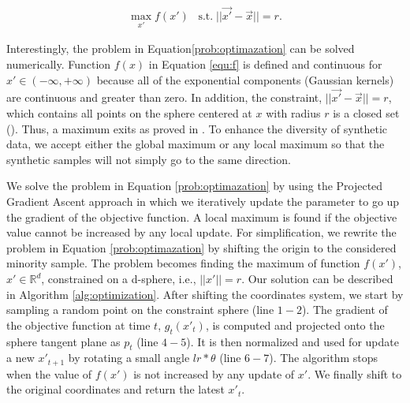 \begin{align}
	\label{prob:optimazation}
	\max_{x'} {f(x')} \;\;\; \textrm{s.t.}\; ||\vec{x'} - \vec{x}||=r.
\end{align}

Interestingly, the problem in Equation\ref{prob:optimazation} can be solved numerically. Function $f(x)$ in Equation \ref{equ:f} is defined and continuous for $x' \in (-\infty, +\infty)$ because all of the exponential components (Gaussian kernels) are continuous and greater than zero. In addition, the constraint, $||\vec{x'} - \vec{x}||=r$, which contains all points on the sphere centered at $x$ with radius $r$ is a closed set (\cite{wikipedia_2021}). Thus, a maximum exits as proved in \cite{maximum_exist}. To enhance the diversity of synthetic data, we accept either the global maximum or any local maximum so that the synthetic samples will not simply go to the same direction.  


We solve the problem in Equation \ref{prob:optimazation} by using the Projected Gradient Ascent approach in which we iteratively update the parameter to go up the gradient of the objective function. A local maximum is found if the objective value cannot be increased by any local update. For simplification, we rewrite the problem in Equation \ref{prob:optimazation} by shifting the origin to the considered minority sample. The problem becomes finding the maximum of function $f(x')$, $x' \in \mathbb{R}^d$, constrained on a d-sphere, i.e., $||x'||=r$. Our solution can be described in Algorithm \ref{alg:optimization}. After shifting the coordinates system, we start by sampling a random point on the constraint sphere (line $1-2$). The gradient of the objective function at time $t$, $g_t(x'_t)$, is computed and projected onto the sphere tangent plane as $p_t$ (line $4-5$). It is then normalized and used for update a new $x'_{t+1}$ by rotating a small angle $lr*\theta$ (line $6-7$). The algorithm stops when the value of $f(x')$ is not increased by any update of $x'$. We finally shift to the original coordinates and return the latest $x'_t$.  

